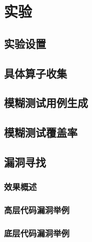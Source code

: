 
\chapter{实验}


\section{实验设置}


\section{具体算子收集}


\section{模糊测试用例生成}


\section{模糊测试覆盖率}


\section{漏洞寻找}

\subsection{效果概述}


\subsection{高层代码漏洞举例}


\subsection{底层代码漏洞举例}



